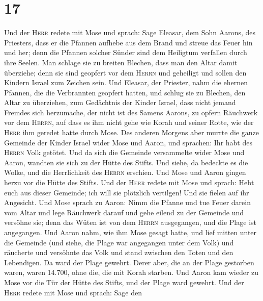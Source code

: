\hypertarget{section-16}{%
\section{17}\label{section-16}}

 Und der \textsc{Herr} redete mit Mose und sprach:
 Sage Eleasar, dem Sohn Aarons, des Priesters, dass er die
Pfannen aufhebe aus dem Brand und streue das Feuer hin und her;
 denn die Pfannen solcher Sünder sind dem Heiligtum
verfallen durch ihre Seelen. Man schlage sie zu breiten Blechen, dass
man den Altar damit überziehe; denn sie sind geopfert vor dem
\textsc{Herrn} und geheiligt und sollen den Kindern Israel zum Zeichen
sein.  Und Eleasar, der Priester, nahm die ehernen
Pfannen, die die Verbrannten geopfert hatten, und schlug sie zu Blechen,
den Altar zu überziehen,  zum Gedächtnis der Kinder
Israel, dass nicht jemand Fremdes sich herzumache, der nicht ist des
Samens Aarons, zu opfern Räuchwerk vor dem \textsc{Herrn}, auf dass es
ihm nicht gehe wie Korah und seiner Rotte, wie der \textsc{Herr} ihm
geredet hatte durch Mose.  Des anderen Morgens aber murrte
die ganze Gemeinde der Kinder Israel wider Mose und Aaron, und sprachen:
Ihr habt des \textsc{Herrn} Volk getötet.  Und da sich die
Gemeinde versammelte wider Mose und Aaron, wandten sie sich zu der Hütte
des Stifts. Und siehe, da bedeckte es die Wolke, und die Herrlichkeit
des \textsc{Herrn} erschien.  Und Mose und Aaron gingen
herzu vor die Hütte des Stifts.  Und der \textsc{Herr}
redete mit Mose und sprach:  Hebt euch aus dieser
Gemeinde; ich will sie plötzlich vertilgen! Und sie fielen auf ihr
Angesicht.  Und Mose sprach zu Aaron: Nimm die Pfanne und
tue Feuer darein vom Altar und lege Räuchwerk darauf und gehe eilend zu
der Gemeinde und versöhne sie; denn das Wüten ist von dem \textsc{Herrn}
ausgegangen, und die Plage ist angegangen.  Und Aaron
nahm, wie ihm Mose gesagt hatte, und lief mitten unter die Gemeinde (und
siehe, die Plage war angegangen unter dem Volk) und räucherte und
versöhnte das Volk  und stand zwischen den Toten und den
Lebendigen. Da ward der Plage gewehrt.  Derer aber, die
an der Plage gestorben waren, waren 14.700, ohne die, die mit Korah
starben.  Und Aaron kam wieder zu Mose vor die Tür der
Hütte des Stifts, und der Plage ward gewehrt.  Und der
\textsc{Herr} redete mit Mose und sprach:  Sage den
